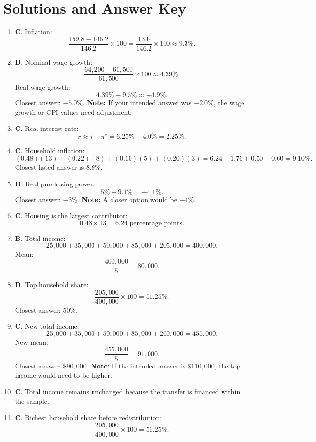 \documentclass[12pt]{article}
\begin{document}
\section*{Solutions and Answer Key}

\begin{enumerate}
\item \textbf{C}. Inflation:
\[
\frac{159.8-146.2}{146.2}\times 100
=\frac{13.6}{146.2}\times 100 \approx 9.3\%.
\]

\item \textbf{D}. Nominal wage growth:
\[
\frac{64,200-61,500}{61,500}\times 100 \approx 4.39\%.
\]
Real wage growth:
\[
4.39\%-9.3\%\approx -4.9\%.
\]
Closest answer: \(-5.0\%\).  
\textbf{Note:} If your intended answer was \(-2.0\%\), the wage growth or CPI values need adjustment.

\item \textbf{C}. Real interest rate:
\[
r \approx i-\pi^e=6.25\%-4.0\%=2.25\%.
\]

\item \textbf{C}. Household inflation:
\[
(0.48)(13)+(0.22)(8)+(0.10)(5)+(0.20)(3)
=6.24+1.76+0.50+0.60=9.10\%.
\]
Closest listed answer is \(8.9\%\).

\item \textbf{D}. Real purchasing power:
\[
5\%-9.1\%=-4.1\%.
\]
Closest answer: \(-3\%\).  
\textbf{Note:} A closer option would be \(-4\%\).

\item \textbf{C}. Housing is the largest contributor:
\[
0.48\times 13=6.24 \text{ percentage points}.
\]

\item \textbf{B}. Total income:
\[
25,000+35,000+50,000+85,000+205,000=400,000.
\]
Mean:
\[
\frac{400,000}{5}=80,000.
\]

\item \textbf{D}. Top household share:
\[
\frac{205,000}{400,000}\times 100=51.25\%.
\]
Closest answer: \(50\%\).

\item \textbf{C}. New total income:
\[
25,000+35,000+50,000+85,000+260,000=455,000.
\]
New mean:
\[
\frac{455,000}{5}=91,000.
\]
Closest answer: \(\$90,000\).  
\textbf{Note:} If the intended answer is \(\$110,000\), the top income would need to be higher.

\item \textbf{C}. Total income remains unchanged because the transfer is financed within the sample.

\item \textbf{C}. Richest household share before redistribution:
\[
\frac{205,000}{400,000}\times 100=51.25\%.
\]


\end{enumerate}
\end{document}
